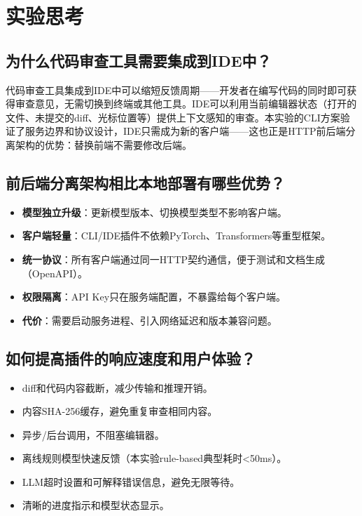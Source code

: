 \documentclass{experimentreport}
\begin{document}
\section{实验思考}

\subsection{为什么代码审查工具需要集成到IDE中？}

代码审查工具集成到IDE中可以缩短反馈周期——开发者在编写代码的同时即可获得审查意见，无需切换到终端或其他工具。IDE可以利用当前编辑器状态（打开的文件、未提交的diff、光标位置等）提供上下文感知的审查。本实验的CLI方案验证了服务边界和协议设计，IDE只需成为新的客户端——这也正是HTTP前后端分离架构的优势：替换前端不需要修改后端。

\subsection{前后端分离架构相比本地部署有哪些优势？}

\begin{itemize}
  \item \textbf{模型独立升级}：更新模型版本、切换模型类型不影响客户端。
  \item \textbf{客户端轻量}：CLI/IDE插件不依赖PyTorch、Transformers等重型框架。
  \item \textbf{统一协议}：所有客户端通过同一HTTP契约通信，便于测试和文档生成（OpenAPI）。
  \item \textbf{权限隔离}：API Key只在服务端配置，不暴露给每个客户端。
  \item \textbf{代价}：需要启动服务进程、引入网络延迟和版本兼容问题。
\end{itemize}

\subsection{如何提高插件的响应速度和用户体验？}

\begin{itemize}
  \item diff和代码内容截断，减少传输和推理开销。
  \item 内容SHA-256缓存，避免重复审查相同内容。
  \item 异步/后台调用，不阻塞编辑器。
  \item 离线规则模型快速反馈（本实验rule-based典型耗时<50ms）。
  \item LLM超时设置和可解释错误信息，避免无限等待。
  \item 清晰的进度指示和模型状态显示。
\end{itemize}
\end{document}

